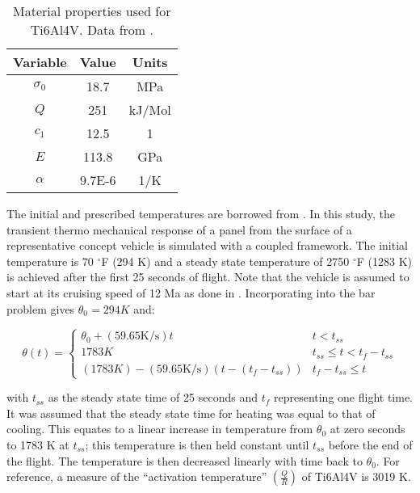 \documentclass[conf]{new-aiaa}
\begin{document}
\begin{table}[H]
  \centering
  \caption{
    Material properties used for Ti6Al4V.
    Data from 
    \cite{ lavina_creep_behavior_of_Ti6Al4V_from_450C_to_600C,
      boyer_materials_properties_handbook_titanium_alloys}.}
  \begin{tabular}{|c|c|c|}
    \hline
    Variable & Value & Units  \\
    \hline
    $\sigma_0$ & 18.7  & MPa    \\
    $Q$      & 251     & kJ/Mol \\
    $c_1$    & 12.5    & 1      \\
    $E$      & 113.8   & GPa    \\
    $\alpha$ & 9.7E-6  & 1/K    \\
    \hline
  \end{tabular}
  \label{tab_material_properties}
\end{table}


The initial and prescribed temperatures are borrowed from 
\cite{ culler_impact_of_FTS_coupling_on_response_prediction_hypersonic_skin_panels}.
In this study, the transient thermo mechanical response of a panel from the 
surface of a representative concept vehicle is simulated with a coupled framework.
The initial temperature is 70 $^{\circ}$F (294 K) and a steady state temperature 
of 2750 $^{\circ}$F (1283 K) is achieved after the first 25 seconds of flight.
Note that the vehicle is assumed to start at its cruising speed of 12 Ma
as done in \cite{ culler_impact_of_FTS_coupling_on_response_prediction_hypersonic_skin_panels}.
Incorporating into the bar problem
gives $\theta_0 = 294 K$ and:

\begin{equation}
\theta(t) = \begin{cases}
 \theta_0 + (59.65 \text{K/s})t                & t < t_{ss} \\
1783 K                                         & t_{ss} \leq t < t_f-t_{ss} \\
(1783 K) - (59.65 \text{K/s})(t-(t_f-t_{ss}))  & t_f - t_{ss} \leq t
\end{cases}
\end{equation}

\noindent
with $t_{ss}$ as the steady state time of 25 seconds
and $t_f$ representing one flight time.
It was assumed that the steady state time for heating was
equal to that of cooling.
This equates to a linear increase in temperature from 
$\theta_0$ at zero seconds to 1783 K at $t_{ss}$;
this temperature is then held constant until $t_{ss}$ before
the end of the flight.
The temperature is then decreased linearly with time back to $\theta_0$.
For reference, a measure of the ``activation temperature'' 
$\left(\frac{Q}{R}\right)$ of Ti6Al4V is 3019 K.
\end{document}
